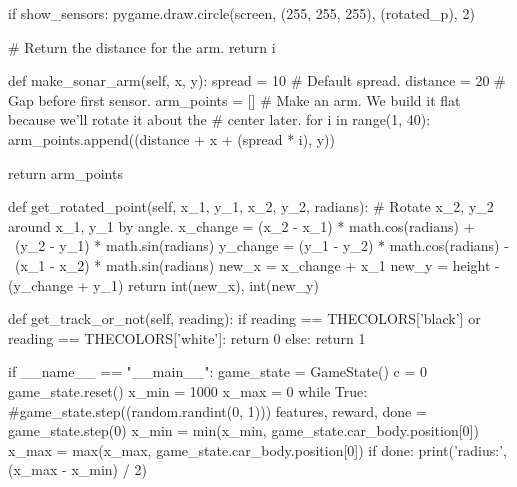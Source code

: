 \begin{python}
if show_sensors:
pygame.draw.circle(screen, (255, 255, 255), (rotated_p), 2)

# Return the distance for the arm.
return i

def make_sonar_arm(self, x, y):
spread = 10  # Default spread.
distance = 20  # Gap before first sensor.
arm_points = []
# Make an arm. We build it flat because we'll rotate it about the
# center later.
for i in range(1, 40):
arm_points.append((distance + x + (spread * i), y))

return arm_points

def get_rotated_point(self, x_1, y_1, x_2, y_2, radians):
# Rotate x_2, y_2 around x_1, y_1 by angle.
x_change = (x_2 - x_1) * math.cos(radians) + \
(y_2 - y_1) * math.sin(radians)
y_change = (y_1 - y_2) * math.cos(radians) - \
(x_1 - x_2) * math.sin(radians)
new_x = x_change + x_1
new_y = height - (y_change + y_1)
return int(new_x), int(new_y)

def get_track_or_not(self, reading):
if reading == THECOLORS['black'] or reading == THECOLORS['white']:
return 0
else:
return 1

if __name__ == "__main__":
game_state = GameState()
c = 0
game_state.reset()
x_min = 1000
x_max = 0
while True:
#game_state.step((random.randint(0, 1)))
features, reward, done = game_state.step(0)
x_min = min(x_min, game_state.car_body.position[0])
x_max = max(x_max, game_state.car_body.position[0])
if done:
print('radius:', (x_max - x_min) / 2)
\end{python}